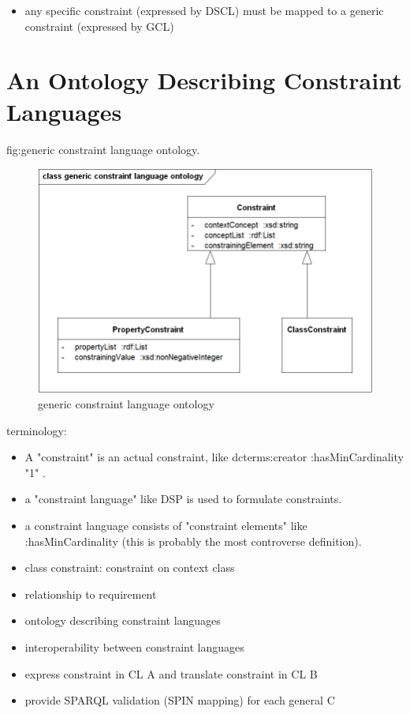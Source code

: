 \documentclass{llncs}
\begin{document}
\begin{itemize}
	\item any specific constraint (expressed by DSCL) must be mapped to a generic constraint (expressed by GCL)
\end{itemize}

\section{An Ontology Describing Constraint Languages} 

fig:generic constraint language ontology.  
\begin{figure}
	\centering
		\includegraphics[width=1.00\textwidth]{generic constraint language ontology/generic constraint language ontology.png}
	\caption{generic constraint language ontology}
	\label{fig:generic constraint language ontology}
\end{figure}

terminology:
\begin{itemize}
	\item A "constraint" is an actual constraint, like dcterms:creator :hasMinCardinality "1" .
  \item a "constraint language" like DSP is used to formulate constraints.
  \item a constraint language consists of "constraint elements" like :hasMinCardinality (this is probably the most controverse definition).
	\item class constraint: constraint on context class
\end{itemize}

\begin{itemize}
	\item relationship to requirement
  \item ontology describing constraint languages
	\item interoperability between constraint languages
  \item express constraint in CL A and translate constraint in CL B
  \item provide SPARQL validation (SPIN mapping) for each general C 
\end{itemize}

{}

\setcounter{tocdepth}{1}
\end{document}
